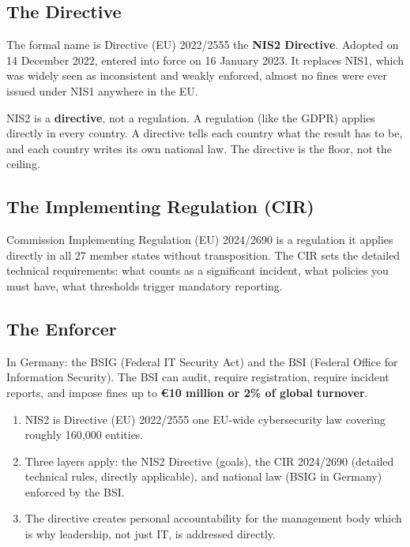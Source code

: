 \documentclass[11pt,a4paper,twoside]{book}
\begin{document}
\subsection*{The Directive}

The formal name is Directive (EU) 2022/2555 the \textbf{NIS2 Directive}. Adopted on 14 December 2022, entered into force on 16 January 2023. It replaces NIS1, which was widely seen as inconsistent and weakly enforced, almost no fines were ever issued under NIS1 anywhere in the EU.

NIS2 is a \textbf{directive}, not a regulation. A regulation (like the GDPR) applies directly in every country. A directive tells each country what the result has to be, and each country writes its own national law. The directive is the floor, not the ceiling.

\subsection*{The Implementing Regulation (CIR)}

Commission Implementing Regulation (EU) 2024/2690 is a regulation it applies directly in all 27 member states without transposition. The CIR sets the detailed technical requirements: what counts as a significant incident, what policies you must have, what thresholds trigger mandatory reporting.

\subsection*{The Enforcer}

In Germany: the BSIG (Federal IT Security Act) and the BSI (Federal Office for Information Security). The BSI can audit, require registration, require incident reports, and impose fines up to \textbf{€10 million or 2\% of global turnover}.

\begin{keytakeaways}
\begin{enumerate}
  \item NIS2 is Directive (EU) 2022/2555 one EU-wide cybersecurity law covering roughly 160,000 entities.
  \item Three layers apply: the NIS2 Directive (goals), the CIR 2024/2690 (detailed technical rules, directly applicable), and national law (BSIG in Germany) enforced by the BSI.
  \item The directive creates personal accountability for the management body which is why leadership, not just IT, is addressed directly.
\end{enumerate}
\end{keytakeaways}
\end{document}
